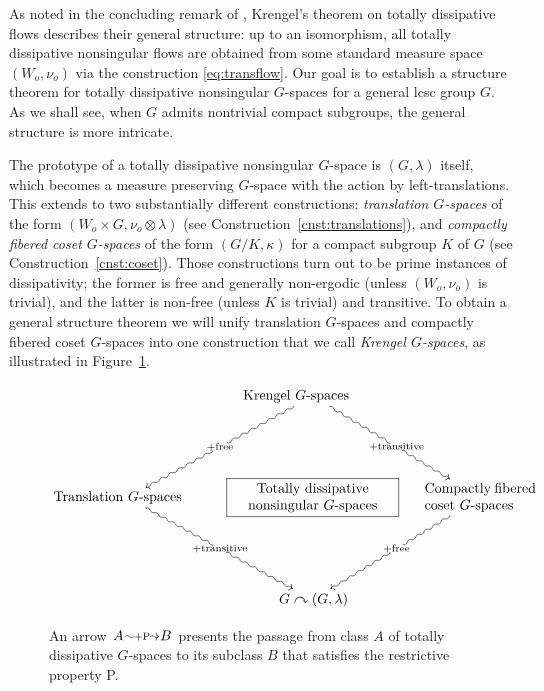 \documentclass{amsart}
\numberwithin{equation}{subsection}
\begin{document}
As noted in the concluding remark of \cite{krengel1968I}, Krengel’s theorem on totally dissipative flows describes their general structure: up to an isomorphism, all totally dissipative nonsingular flows are obtained from some standard measure space \(\left(W_{o},\nu_{o}\right)\) via the construction \eqref{eq:transflow}. Our goal is to establish a structure theorem for totally dissipative nonsingular \(G\)-spaces for a general lcsc group \(G\). As we shall see, when \(G\) admits nontrivial compact subgroups, the general structure is more intricate.

The prototype of a totally dissipative nonsingular \(G\)-space is \(\left(G,\lambda\right)\) itself, which becomes a measure preserving \(G\)-space with the action by left-translations. This extends to two substantially different constructions: \emph{translation \(G\)-spaces} of the form \(\left(W_{o}\times G,\nu_{o}\otimes\lambda\right)\) (see Construction~\ref{cnst:translations}), and \emph{compactly fibered coset \(G\)-spaces} of the form \(\left(G/K,\kappa\right)\) for a compact subgroup \(K\) of \(G\) (see Construction~\ref{cnst:coset}). Those constructions turn out to be prime instances of dissipativity; the former is free and generally non-ergodic (unless \(\left(W_{o},\nu_{o}\right)\) is trivial), and the latter is non-free (unless \(K\) is trivial) and transitive. To obtain a general structure theorem we will unify translation \(G\)-spaces and compactly fibered coset \(G\)-spaces into one construction that we call \emph{Krengel \(G\)-spaces}, as illustrated in Figure~\ref{Figure: structure dissipative}.

\begin{figure}
\[
\xymatrix@R=1.7cm@C=0cm{
    & \parbox{3.5cm}{Krengel \(G\)-spaces}\ar@{~>}[dl]|{+\text{free}}\ar@{~>}[dr]|{+\text{transitive}}
    & \\ 
    \parbox{3.7cm}{Translation \(G\)-spaces} \ar@{~>}[dr]|{+\text{transitive}}
    & \boxed{\parbox{4.1cm}{\centering \textbf{Totally dissipative}\\\textbf{nonsingular \(G\)-spaces}}}
    & \parbox{2.8cm}{Compactly fibered coset \(G\)-spaces} \ar@{~>}[dl]|{+\text{free}} \\
    & \qquad\qquad\parbox{3.8cm}{\quad\(G\curvearrowright\left(G,\lambda\right)\)} &
}
\]
\caption[.]{An arrow \(\xymatrix@1{A\ar@{~>}[r]|{+\text{P}}& B}\) presents the passage from class \(A\) of totally dissipative \(G\)-spaces to its subclass \(B\) that satisfies the restrictive property P.}
\label{Figure: structure dissipative}
\end{figure}
\end{document}
